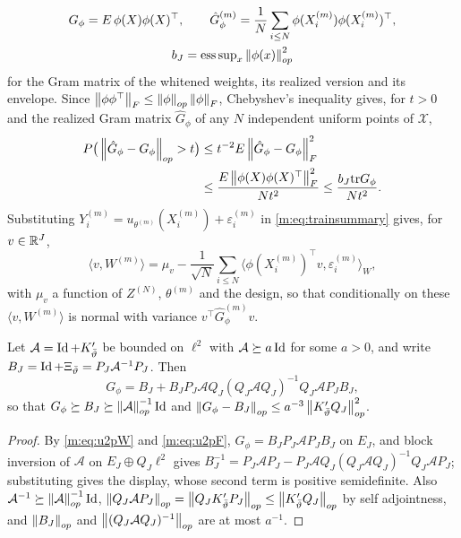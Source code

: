 \[
\begin{gathered}
G_\phi=E\,\phi(X)\phi(X)^\top,\qquad\hat G^{(m)}_\phi=\frac1N\sum_{i\le N}\phi(X^{(m)}_i)\phi(X^{(m)}_i)^\top,\\
b_J=\mathrm{ess\,sup}_x\left\|\phi(x)\right\|^2_{op}
\end{gathered}
\]
for the Gram matrix of the whitened weights, its realized version and its envelope. Since $\left\|\phi\phi^\top\right\|_F\le\left\|\phi\right\|_{op}\left\|\phi\right\|_F$, Chebyshev's inequality gives, for $t>0$ and the realized Gram matrix $\hat G_\phi$ of any $N$ independent uniform points of $\mathcal X$,
\begin{equation}\label{m:eq:u2pcheb}
\begin{aligned}
P\big(\left\|\hat G_\phi-G_\phi\right\|_{op}>t\big)&\le t^{-2}E\left\|\hat G_\phi-G_\phi\right\|^2_F\\
&\le\frac{E\left\|\phi(X)\phi(X)^\top\right\|^2_F}{Nt^2}\le\frac{b_J\mathrm{tr} G_\phi}{Nt^2} .
\end{aligned}
\end{equation}
Substituting $Y^{(m)}_i=u_{\theta^{(m)}}(X^{(m)}_i)+\varepsilon^{(m)}_i$ in \eqref{m:eq:trainsummary} gives, for $v\in\mathbb{R}^J$,
\begin{equation}\label{m:eq:u2pdecomp}
\langle v,W^{(m)}\rangle=\mu_v-\frac1{\sqrt N}\sum_{i\le N}\big\langle\phi(X^{(m)}_i)^\top v,\varepsilon^{(m)}_i\big\rangle_W ,
\end{equation}
with $\mu_v$ a function of $Z^{(N)}$, $\theta^{(m)}$ and the design, so that conditionally on these $\langle v,W^{(m)}\rangle$ is normal with variance $v^\top\hat G^{(m)}_\phi v$.

\begin{lemma}\label{m:lem:u2pgram}
Let $\mathcal A=\operatorname{Id}+K'_{\bar\vartheta}$ be bounded on $\ell^2$ with $\mathcal A\succeq a\operatorname{Id}$ for some $a>0$, and write $B_J=\operatorname{Id}+\Xi_{\bar\vartheta}=P_J\mathcal A^{-1}P_J$. Then
\[
G_\phi=B_J+B_JP_J\mathcal AQ_J(Q_J\mathcal AQ_J)^{-1}Q_J\mathcal AP_JB_J ,
\]
so that $G_\phi\succeq B_J\succeq\left\|\mathcal A\right\|^{-1}_{op}\operatorname{Id}$ and $\left\|G_\phi-B_J\right\|_{op}\le a^{-3}\left\|K'_{\bar\vartheta}Q_J\right\|^2_{op}$.
\end{lemma}

\begin{proof}
By \eqref{m:eq:u2pW} and \eqref{m:eq:u2pF}, $G_\phi=B_JP_J\mathcal AP_JB_J$ on $E_J$, and block inversion of $\mathcal A$ on $E_J\oplus Q_J\ell^2$ gives $B_J^{-1}=P_J\mathcal AP_J-P_J\mathcal AQ_J(Q_J\mathcal AQ_J)^{-1}Q_J\mathcal AP_J$; substituting gives the display, whose second term is positive semidefinite. Also $\mathcal A^{-1}\succeq\left\|\mathcal A\right\|^{-1}_{op}\operatorname{Id}$, $\left\|Q_J\mathcal AP_J\right\|_{op}=\left\|Q_JK'_{\bar\vartheta}P_J\right\|_{op}\le\left\|K'_{\bar\vartheta}Q_J\right\|_{op}$ by self adjointness, and $\left\|B_J\right\|_{op}$ and $\left\|(Q_J\mathcal AQ_J)^{-1}\right\|_{op}$ are at most $a^{-1}$.
\end{proof}

